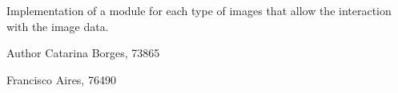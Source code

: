 Implementation of a module for each type of images that allow the interaction with the image data.\begin{DoxyAuthor}{Author}
Catarina Borges, 73865 

Francisco Aires, 76490 
\end{DoxyAuthor}
